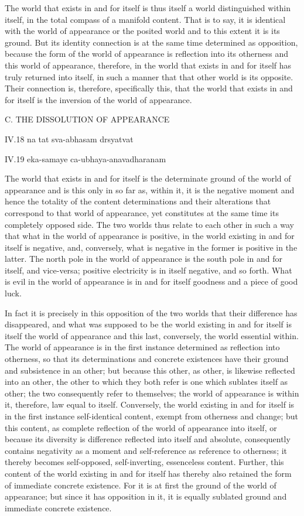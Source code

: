 The world that exists in and for itself is thus itself
a world distinguished within itself,
in the total compass of a manifold content.
That is to say, it is identical with the world of appearance
or the posited world and to this extent it is its ground.
But its identity connection is at the same time
determined as opposition,
because the form of the world of appearance is
reflection into its otherness
and this world of appearance, therefore, in the
world that exists in and for itself has truly returned into itself, in such a
manner that that other world is its opposite.
Their connection is, therefore, specifically this,
that the world that exists in and for itself is
the inversion of the world of appearance.

C. THE DISSOLUTION OF APPEARANCE

IV.18
na tat sva-abhasam drsyatvat

IV.19
eka-samaye ca-ubhaya-anavadharanam

The world that exists in and for itself is
the determinate ground of the world of appearance
and is this only in so far as, within it, it is the negative
moment and hence the totality of the content determinations and their
alterations that correspond to that world of appearance,
yet constitutes at the same time its completely opposed side.
The two worlds thus relate to each other in such a way
that what in the world of appearance is positive,
in the world existing in and for itself is negative,
and, conversely, what is negative in the former is
positive in the latter.
The north pole in the world of appearance is
the south pole in and for itself,  and vice-versa;
positive electricity is in itself negative, and so forth.
What is evil in the world of appearance is
in and for itself goodness and a piece of good luck.

In fact it is precisely in this opposition of the two worlds that their
difference has disappeared, and what was supposed to be the world existing
in and for itself is itself the world of appearance and this last, conversely,
the world essential within.
The world of appearance is in the first instance
determined as reflection into otherness,
so that its determinations and concrete existences have
their ground and subsistence in an other;
but because this other, as other, is likewise reflected into an other,
the other to which they both refer is one which sublates itself as other;
the two consequently refer to themselves;
the world of appearance is within it, therefore, law equal to itself.
Conversely, the world existing in and for itself is
in the first instance self-identical content,
exempt from otherness and change;
but this content, as complete reflection of
the world of appearance into itself,
or because its diversity is difference
reflected into itself and absolute,
consequently contains negativity as a moment
and self-reference as reference to otherness;
it thereby becomes self-opposed, self-inverting, essenceless content.
Further, this content of the world existing in and for itself has
thereby also retained the form of immediate concrete existence.
For it is at first the ground of the world of appearance;
but since it has opposition in it, it is equally
sublated ground and immediate concrete existence.

